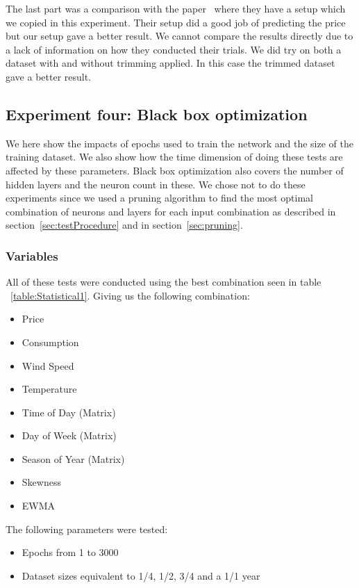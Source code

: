 The last part was a comparison with the paper~\cite{singhal2011electricity} where they have a setup which we copied in this experiment. Their setup did a good job of predicting the price but our setup gave a better result. We cannot compare the results directly due to a lack of information on how they conducted their trials. We did try on both a dataset with and without trimming applied. In this case the trimmed dataset gave a better result.

\newpage
\subsection{Experiment four: Black box optimization}
\label{sec:priceExperimentFour}
We here show the impacts of epochs used to train the network and the size of the training dataset. We also show how the time dimension of doing these tests are affected by these parameters. Black box optimization also covers the number of hidden layers and the neuron count in these. We chose not to do these experiments since we used a pruning algorithm to find the most optimal combination of neurons and layers for each input combination as described in section~\ref{sec:testProcedure} and in section~\ref{sec:pruning}.

\subsubsection{Variables}
All of these tests were conducted using the best combination seen in table ~\ref{table:Statistical1}. Giving us the following combination:
\begin{itemize}
	\item Price
	\item Consumption
	\item Wind Speed
	\item Temperature
	\item Time of Day (Matrix)
	\item Day of Week (Matrix)
	\item Season of Year (Matrix)
	\item Skewness
	\item EWMA
\end{itemize}

The following parameters were tested:

\begin{itemize}
	\item Epochs from 1 to 3000
	\item Dataset sizes equivalent to 1/4, 1/2, 3/4 and a 1/1 year
\end{itemize}

